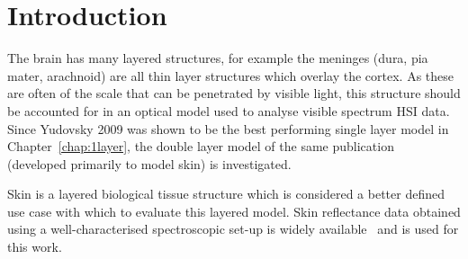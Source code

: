 
\section{Introduction}\label{sec:intro2}
The brain has many layered structures, for example the meninges (dura, pia mater, arachnoid) are all thin layer structures which overlay the cortex. As these are often of the scale that can be penetrated by visible light, this structure should be accounted for in an optical model used to analyse visible spectrum HSI data. Since Yudovsky 2009 was shown to be the best performing single layer model in Chapter~\ref{chap:1layer}, the double layer model of the same publication~\citep{Yudovsky2009} (developed primarily to model skin) is investigated. 

Skin is a layered biological tissue structure which is considered a better defined use case with which to evaluate this layered model. Skin reflectance data obtained using a well-characterised spectroscopic set-up is widely available~\citep{Cooksey2017} and is used for this work. 



